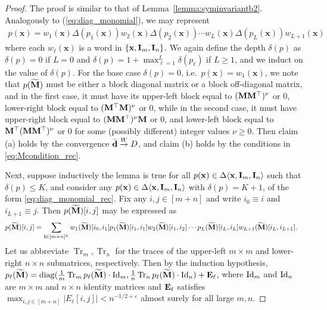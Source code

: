 \documentclass[10pt,reqno]{amsart}
\def\x{\mathbf{x}}
\def\diag{\operatorname{diag}}
\def\toW{\overset{W}{\to}}
\def\bi{\mathbf{i}}
\def\bx{\mathbf{x}}
\def\eps{\varepsilon}
\def\Tr{\operatorname{Tr}}
\begin{document}
\begin{proof}
The proof is similar to that of Lemma~\ref{lemma:syminvariantb2}. Analogously to
(\ref{eq:diag_monomial}), we may represent
\begin{align}\label{eq:diag_monomial_rec}
p(\x)=w_1(\x)\Delta(p_1(\x))w_2(\x)\Delta(p_2(\x))
\cdots w_L(\x)\Delta(p_L(\x))w_{L+1}(\x)
\end{align}
where each $w_\ell(\x)$ is a word in $\{\x,\bI_m,\bI_n\}$. We again define the depth
$\delta(p)$ as $\delta(p)=0$ if $L=0$ and $\delta(p)=1+\max_{\ell=1}^L
\delta(p_\ell)$ if $L \geq 1$, and we induct on the value of $\delta(p)$.
For the base case $\delta(p)=0$, i.e.\ $p(\x)=w_1(\x)$, we note that
$p(\widetilde{\mathbf{M}})$ must be either a block diagonal matrix or a block off-diagonal matrix, 
and in the first case, it must have its upper-left block equal to $(\mathbf{M}\mathbf{M}^\top)^\nu$ or 0,
lower-right block equal to $(\mathbf{M}^\top\mathbf{M})^\nu$ or 0,
while in the second case, it must have upper-right block equal to $(\mathbf{M}\mathbf{M}^\top)^\nu\mathbf{M}$ or 0, and
lower-left block equal to $\mathbf{M}^\top(\mathbf{M}\mathbf{M}^\top)^\nu$ or 0 for some (possibly
different) integer values $\nu \geq 0$. Then claim (a) holds by the convergence
$\bar{\bd} \toW D$, and claim (b) holds by the
conditions in \eqref{eq:Mcondition_rec}.

Next, suppose inductively the lemma is true for all $p(\bx)\in\Delta\langle\bx,\bI_m,\bI_n\rangle$
such that $\delta(p)\leq K$, and consider any
$p(\bx)\in\Delta\langle\bx,\bI_m,\bI_n\rangle$ with $\delta(p)=K+1$,
of the form \eqref{eq:diag_monomial_rec}.
Fix any $i,j\in[m+n]$ and write $i_0\equiv i$ and $i_{L+1}\equiv j$. Then 
$p(\widetilde{\mathbf{M}})[i,j]$ may be expressed as
\begin{align*}
	p(\widetilde\bM)[i,j] &= \sum_{\bi\in[m+n]^L} 
	w_1(\widetilde \bM)[i_0,i_1] p_1(\widetilde\bM)[i_1,i_1] w_2(\widetilde
\bM)[i_1,i_2]
	\cdots p_{L}(\widetilde\bM)[i_{L},i_{L}] w_{L+1}(\widetilde \bM)[i_L,i_{L+1}].
\end{align*}
Let us abbreviate $\Tr_m,\Tr_n$ for the traces of the upper-left $m \times m$
and lower-right $n \times n$ submatrices, respectively. Then
by the induction hypothesis,
$p_\ell(\widetilde\bM)=\diag(\frac{1}{m}\Tr_m p_\ell(\widetilde\bM) \cdot \Id_m,
\frac{1}{n}\Tr_n p_\ell(\widetilde\bM) \cdot \Id_n)+\bE_\ell$,
where $\mathrm{Id}_m$ and 
$\mathrm{Id}_n$ are $m\times m$ and $n\times n$ identity matrices and $\mathbf{E}_\ell$
satisfies $\max_{i,j\in[m+n]} |E_\ell[i,j]| < n^{-1/2+\eps}$
almost surely for all large $m,n$.


\end{proof}
\end{document}
